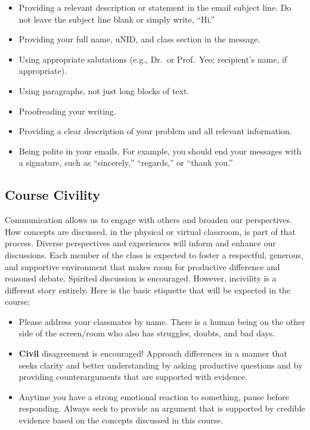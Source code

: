 \documentclass[
  letterpaper,
]{article}
\providecommand{\tightlist}{%
  \setlength{\itemsep}{0pt}\setlength{\parskip}{0pt}}\usepackage{longtable,booktabs,array}
\begin{document}
\begin{itemize}
\tightlist
\item
  Providing a relevant description or statement in the email subject
  line. Do not leave the subject line blank or simply write, ``Hi.''
\item
  Providing your full name, uNID, and class section in the message.
\item
  Using appropriate salutations (e.g., Dr.~or Prof.~Yeo; recipient's
  name, if appropriate).
\item
  Using paragraphs, not just long blocks of text.
\item
  Proofreading your writing.
\item
  Providing a clear description of your problem and all relevant
  information.
\item
  Being polite in your emails. For example, you should end your messages
  with a signature, such as ``sincerely,'' ``regards,'' or ``thank
  you.''
\end{itemize}

\hypertarget{course-civility}{%
\subsection{Course Civility}\label{course-civility}}

Communication allows us to engage with others and broaden our
perspectives. How concepts are discussed, in the physical or virtual
classroom, is part of that process. Diverse perspectives and experiences
will inform and enhance our discussions. Each member of the class is
expected to foster a respectful, generous, and supportive environment
that makes room for productive difference and reasoned debate. Spirited
discussion is encouraged. However, incivility is a different story
entirely. Here is the basic etiquette that will be expected in the
course:

\begin{itemize}
\tightlist
\item
  Please address your classmates by name. There is a human being on the
  other side of the screen/room who also has struggles, doubts, and bad
  days.
\item
  \textbf{Civil} disagreement is encouraged! Approach differences in a
  manner that seeks clarity and better understanding by asking
  productive questions and by providing counterarguments that are
  supported with evidence.
\item
  Anytime you have a strong emotional reaction to something, pause
  before responding. Always seek to provide an argument that is
  supported by credible evidence based on the concepts discussed in this
  course.
\end{itemize}
\end{document}
